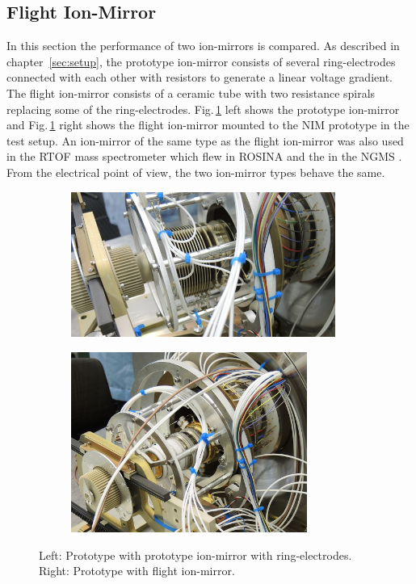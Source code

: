 	\subsection{Flight Ion-Mirror }
	In this section the performance of two ion-mirrors is compared. As described in chapter~\ref{sec:setup}, the prototype ion-mirror consists of several ring-electrodes connected with each other with resistors to generate a linear voltage gradient. The flight ion-mirror consists of a ceramic tube with two resistance spirals replacing some of the ring-electrodes. Fig.\,\ref{fig:ExpRefl} left shows the prototype ion-mirror and Fig.\,\ref{fig:ExpRefl} right shows the flight ion-mirror mounted to the NIM prototype in the test setup. An ion-mirror of the same type as the flight ion-mirror was also used in the RTOF mass spectrometer which flew in ROSINA \cite{Diss_Scherer} and the in the NGMS \cite{Diss_Hofer}. From the electrical point of view, the two ion-mirror types behave the same.\\
	\begin{figure}[h]
		\begin{subfigure}{0.5\textwidth}
			\centering
			\includegraphics[width = 0.95\textwidth]{Experiments/reflectron_Prototype1.jpg}
		\end{subfigure}
		\begin{subfigure}{0.5\textwidth}
			\centering
			\includegraphics[width = 0.85\textwidth]{Experiments/reflectron_flight.JPG}
		\end{subfigure}
		\caption{Left: Prototype with prototype ion-mirror with ring-electrodes. Right: Prototype with flight ion-mirror.}
		\label{fig:ExpRefl}
	\end{figure}
